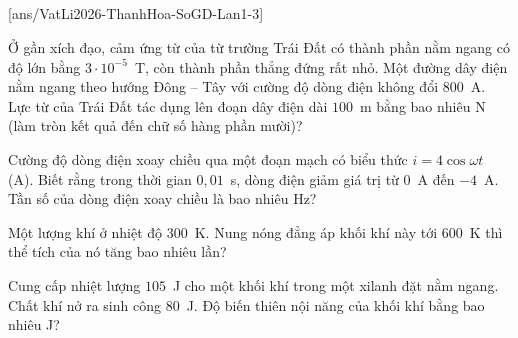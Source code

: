 	\subsection*{}
	\setcounter{ex}{0}
	[ans/VatLi2026-ThanhHoa-SoGD-Lan1-3]

	\begin{ex}%
		Ở gần xích đạo, cảm ứng từ của từ trường Trái Đất có thành phần nằm ngang có độ lớn bằng $3\cdot 10^{-5}$~T, còn thành phần thẳng đứng rất nhỏ. Một đường dây điện nằm ngang theo hướng Đông -- Tây với cường độ dòng điện không đổi $800$~A. Lực từ của Trái Đất tác dụng lên đoạn dây điện dài $100$~m bằng bao nhiêu N (làm tròn kết quả đến chữ số hàng phần mười)?
		\par
	\end{ex}

	\begin{ex}%
		Cường độ dòng điện xoay chiều qua một đoạn mạch có biểu thức $i=4\cos\omega t$ (A). Biết rằng trong thời gian $0{,}01$~s, dòng điện giảm giá trị từ $0$~A đến $-4$~A. Tần số của dòng điện xoay chiều là bao nhiêu Hz?
		\par
	\end{ex}

	\begin{ex}%
		Một lượng khí ở nhiệt độ $300$~K. Nung nóng đẳng áp khối khí này tới $600$~K thì thể tích của nó tăng bao nhiêu lần?
		\par
	\end{ex}

	\begin{ex}%
		Cung cấp nhiệt lượng $105$~J cho một khối khí trong một xilanh đặt nằm ngang. Chất khí nở ra sinh công $80$~J. Độ biến thiên nội năng của khối khí bằng bao nhiêu J?
		\par
	\end{ex}

